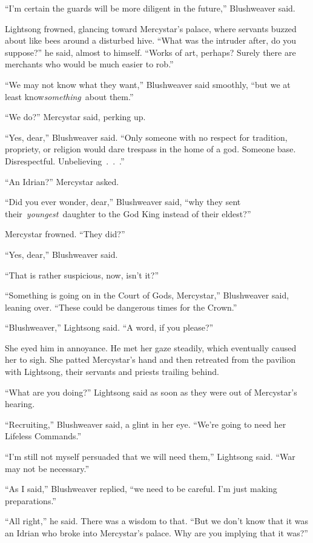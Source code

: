 “I’m certain the guards will be more diligent in the future,” Blushweaver said.

Lightsong frowned, glancing toward Mercystar’s palace, where servants buzzed about like bees around a disturbed hive. “What was the intruder after, do you suppose?” he said, almost to himself. “Works of art, perhaps? Surely there are merchants who would be much easier to rob.”

“We may not know what they want,” Blushweaver said smoothly, “but we at least know\textit{something}~about them.”

“We do?” Mercystar said, perking up.

“Yes, dear,” Blushweaver said. “Only someone with no respect for tradition, propriety, or religion would dare trespass in the home of a god. Someone base. Disrespectful. Unbelieving~.~.~.”

“An Idrian?” Mercystar asked.

“Did you ever wonder, dear,” Blushweaver said, “why they sent their~\textit{youngest}~daughter to the God King instead of their eldest?”

Mercystar frowned. “They did?”

“Yes, dear,” Blushweaver said.

“That is rather suspicious, now, isn’t it?”

“Something is going on in the Court of Gods, Mercystar,” Blushweaver said, leaning over. “These could be dangerous times for the Crown.”

“Blushweaver,” Lightsong said. “A word, if you please?”

She eyed him in annoyance. He met her gaze steadily, which eventually caused her to sigh. She patted Mercystar’s hand and then retreated from the pavilion with Lightsong, their servants and priests trailing behind.

“What are you doing?” Lightsong said as soon as they were out of Mercystar’s hearing.

“Recruiting,” Blushweaver said, a glint in her eye. “We’re going to need her Lifeless Commands.”

“I’m still not myself persuaded that we will need them,” Lightsong said. “War may not be necessary.”

“As I said,” Blushweaver replied, “we need to be careful. I’m just making preparations.”

“All right,” he said. There was a wisdom to that. “But we don’t know that it was an Idrian who broke into Mercystar’s palace. Why are you implying that it was?”

